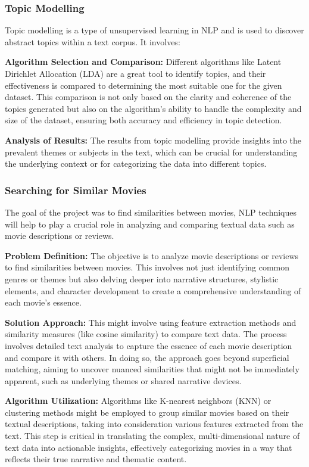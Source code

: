 \documentclass{article}
\begin{document}
\begin{multicols}{2}
\subsubsection{Topic Modelling}

Topic modelling is a type of unsupervised learning in NLP and is used to discover abstract topics within a text corpus. It involves:

\textbf{Algorithm Selection and Comparison:}
Different algorithms like Latent Dirichlet Allocation (LDA) are a great tool to identify topics, and their effectiveness is compared to determining the most suitable one for the given dataset. This comparison is not only based on the clarity and coherence of the topics generated but also on the algorithm's ability to handle the complexity and size of the dataset, ensuring both accuracy and efficiency in topic detection.

\textbf{Analysis of Results:}
The results from topic modelling provide insights into the prevalent themes or subjects in the text, which can be crucial for understanding the underlying context or for categorizing the data into different topics.


\subsubsection{Searching for Similar Movies}

The goal of the project was to find similarities between movies, NLP techniques will help to play a crucial role in analyzing and comparing textual data such as movie descriptions or reviews.

\textbf{Problem Definition:}
The objective is to analyze movie descriptions or reviews to find similarities between movies. This involves not just identifying common genres or themes but also delving deeper into narrative structures, stylistic elements, and character development to create a comprehensive understanding of each movie's essence.

\textbf{Solution Approach:}
This might involve using feature extraction methods and similarity measures (like cosine similarity) to compare text data. The process involves detailed text analysis to capture the essence of each movie description and compare it with others. In doing so, the approach goes beyond superficial matching, aiming to uncover nuanced similarities that might not be immediately apparent, such as underlying themes or shared narrative devices.

\textbf{Algorithm Utilization:}
Algorithms like K-nearest neighbors (KNN) or clustering methods might be employed to group similar movies based on their textual descriptions, taking into consideration various features extracted from the text. This step is critical in translating the complex, multi-dimensional nature of text data into actionable insights, effectively categorizing movies in a way that reflects their true narrative and thematic content.


\end{multicols}
\end{document}
